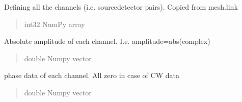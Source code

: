 \documentclass[letterpaper,10pt,english]{sphinxmanual}
\begin{document}
\begin{fulllineitems}
\begin{fulllineitems}
\label{\detokenize{_autosummary/nirfasterff.base.data.FDdata:nirfasterff.base.data.FDdata.link}}
\pysigstartsignatures
\pysigline
{}
\pysigstopsignatures
\sphinxAtStartPar
Defining all the channels (i.e. source\sphinxhyphen{}detector pairs). Copied from mesh.link
\begin{quote}\begin{description}
\sphinxAtStartPar
int32 NumPy array

\end{description}\end{quote}

\end{fulllineitems}


\begin{fulllineitems}
\label{\detokenize{_autosummary/nirfasterff.base.data.FDdata:nirfasterff.base.data.FDdata.amplitude}}
\pysigstartsignatures
\pysigline
{}
\pysigstopsignatures
\sphinxAtStartPar
Absolute amplitude of each channel. I.e. amplitude=abs(complex)
\begin{quote}\begin{description}
\sphinxAtStartPar
double Numpy vector

\end{description}\end{quote}

\end{fulllineitems}


\begin{fulllineitems}
\label{\detokenize{_autosummary/nirfasterff.base.data.FDdata:nirfasterff.base.data.FDdata.phase}}
\pysigstartsignatures
\pysigline
{}
\pysigstopsignatures
\sphinxAtStartPar
phase data of each channel. All zero in case of CW data
\begin{quote}\begin{description}
\sphinxAtStartPar
double Numpy vector

\end{description}\end{quote}


\end{fulllineitems}
\end{fulllineitems}
\end{document}
